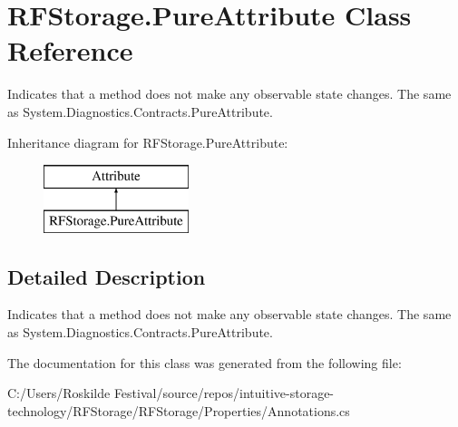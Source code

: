 \section{R\+F\+Storage.\+Pure\+Attribute Class Reference}
\label{class_r_f_storage_1_1_pure_attribute}


Indicates that a method does not make any observable state changes. The same as {\ttfamily System.\+Diagnostics.\+Contracts.\+Pure\+Attribute}.  


Inheritance diagram for R\+F\+Storage.\+Pure\+Attribute\+:\begin{figure}[H]
\begin{center}
\leavevmode
\includegraphics[height=2.000000cm]{class_r_f_storage_1_1_pure_attribute}
\end{center}
\end{figure}


\subsection{Detailed Description}
Indicates that a method does not make any observable state changes. The same as {\ttfamily System.\+Diagnostics.\+Contracts.\+Pure\+Attribute}. 


\begin{DoxyCode}{0}
\DoxyCodeLine{}
\DoxyCodeLine{\}}
\end{DoxyCode}


The documentation for this class was generated from the following file\+:\begin{DoxyCompactItemize}
\item 
C\+:/\+Users/\+Roskilde Festival/source/repos/intuitive-\/storage-\/technology/\+R\+F\+Storage/\+R\+F\+Storage/\+Properties/Annotations.\+cs\end{DoxyCompactItemize}
